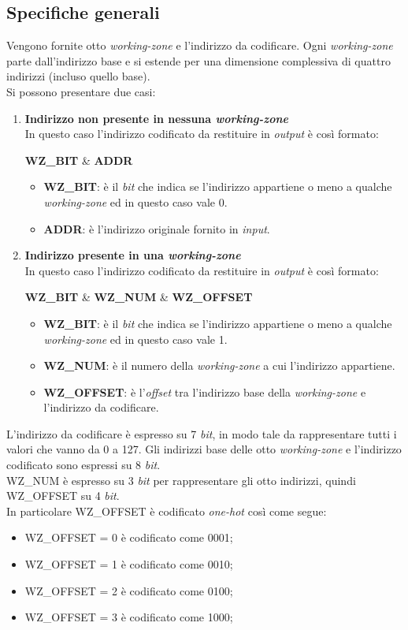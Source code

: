 \documentclass{article}
\begin{document}
\subsection{Specifiche generali}
Vengono fornite otto \textit{working-zone} e l'indirizzo da codificare. Ogni \textit{working-zone} parte dall'indirizzo base e si estende per una dimensione complessiva di quattro indirizzi (incluso quello base).\\Si possono presentare due casi:
\begin{enumerate}
\item\textbf{Indirizzo non presente in nessuna \textit{working-zone}}\\
In questo caso l'indirizzo codificato da restituire in \textit{output} è così formato:
\begin{center}
\textbf{WZ\_BIT} \& \textbf{ADDR}
\end{center}
\begin{itemize}
\item\textbf{WZ\_BIT}: è il \textit{\textit{bit}} che indica se l'indirizzo appartiene o meno a qualche \textit{working-zone} ed in questo caso vale 0.
\item\textbf{ADDR}: è l'indirizzo originale fornito in \textit{input}.
\end{itemize}
\item\textbf{Indirizzo presente in una \textit{working-zone}}\\
In questo caso l'indirizzo codificato da restituire in \textit{output} è così formato:
\begin{center}
\textbf{WZ\_BIT} \& \textbf{WZ\_NUM} \& \textbf{WZ\_OFFSET}
\end{center}
\begin{itemize}
\item\textbf{WZ\_BIT}: è il \textit{\textit{bit}} che indica se l'indirizzo appartiene o meno a qualche \textit{working-zone} ed in questo caso vale 1.
\item\textbf{WZ\_NUM}: è il numero della \textit{working-zone} a cui l'indirizzo appartiene.
\item\textbf{WZ\_OFFSET}: è l'\textit{offset} tra l'indirizzo base della \textit{working-zone} e l'indirizzo da codificare.
\end{itemize}
\end{enumerate}
L'indirizzo da codificare è espresso su 7 \textit{\textit{bit}}, in modo tale da rappresentare tutti i valori che vanno da 0 a 127. Gli indirizzi base delle otto \textit{working-zone} e l'indirizzo codificato sono espressi su 8 \textit{\textit{bit}}.\\
WZ\_NUM è espresso su 3 \textit{\textit{bit}} per rappresentare gli otto indirizzi, quindi WZ\_OFFSET su 4 \textit{\textit{bit}}.\\
In particolare WZ\_OFFSET è codificato \textit{one-hot} così come segue:
\begin{itemize}
\item WZ\_OFFSET = 0 è codificato come 0001;
\item WZ\_OFFSET = 1 è codificato come 0010;
\item WZ\_OFFSET = 2 è codificato come 0100;
\item WZ\_OFFSET = 3 è codificato come 1000;
\end{itemize}
\pagebreak
\end{document}
